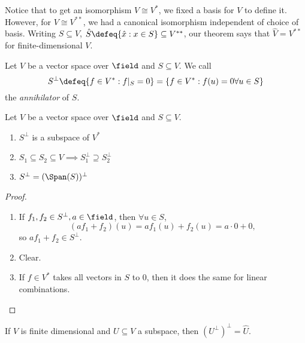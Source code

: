 \begin{remark}
Notice that to get an isomorphism $V \cong V^\ast$, we fixed a basis for $V$ to define it. However, for $V \cong V^{\ast\ast}$, we had a canonical isomorphism independent of choice of basis. Writing $S \subseteq V$, $\hat S \defeq \{\hat{x} : x \in S\} \subseteq V^{\ast\ast}$, our theorem says that $\hat{V} = V^{\ast \ast}$ for finite-dimensional $V$.
\end{remark}

\begin{definition}[Annihilator]
    Let $V$ be a vector space over $\field$ and $S \subseteq V$. We call \[
    S^\perp \defeq \{f \in V^\ast : f\vert_S = 0\}  = \{
        f \in V^\ast : f(u) = 0 \forall u \in S
    \}
    \]
    the \emph{annihilator} of $S$.
\end{definition}

\begin{proposition}
    Let $V$ be a vector space over $\field$ and $S \subseteq V$.
    \begin{enumerate}
        \item $S^\perp$ is a subspace of $V^\ast$\footnotemark
        \item $S_1 \subseteq S_2 \subseteq V \implies S_1^\perp \supseteq S_2^\perp$
        \item $S^\perp = (\Span(S))^\perp$
    \end{enumerate}
\end{proposition}
\begin{proof}
    \begin{enumerate}
        \item If $f_1, f_2 \in S^\perp, a \in \field$, then $\forall u \in S$, \[
        (af_1 +f_2)(u) = af_1(u) + f_2(u) = a\cdot 0 + 0,    
        \]
        so $af_1 + f_2 \in S^\perp$.
        \item Clear.
        \item If $f \in V^\ast$ takes all vectors in $S$ to $0$, then it does the same for linear combinations.
    \end{enumerate}
\end{proof}

\begin{proposition}
    If $V$ is finite dimensional and $U \subseteq V$ a subspace, then $(U^\perp)^\perp = \hat{U}$.
\end{proposition}


